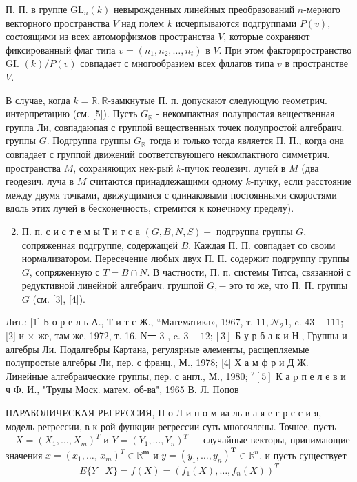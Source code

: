\documentclass[10pt]{article}
\begin{document}
П. П. в группе $\mathrm{GL}_{n}(k)$ невырожденных линейных преобразований $n$-мерного векторного пространства $V$ над полем $k$ исчерпываются подгруппами $P(v)$, состоящими из всех автоморфизмов пространства $V$, которые сохраняют фиксированный флаг типа $v=\left(n_{1}, n_{2}, \ldots, n_{t}\right)$ в $V$. При этом факторпространство GI. $(k) / P(v)$ совпадает с многообразием всех фллагов типа $v$ в пространстве $V$.

В случае, когда $k=\mathbb{R}, \mathbb{R}$-замкнутые П. п. допускают следующую геометрич. интерпретацию (см. [5]). Пусть $G_{\mathbb{R}}$ - некомпактная полупростая вещественная группа Ли, совпадаюпая с группой вещественных точек полупростой алгебраич. группы $G$. Подгруппа группы $G_{\mathbb{R}}$ тогда и только тогда является П. П., когда она совпадает с группой движений соответствующего некомпактного симметрич. пространства $M$, сохраняющих нек-рый $k$-пучок геодезич. лучей в $M$ (два геодезич. луча в $M$ считаются принадлежащими одному $k$-пучку, если расстояние между двумя точками, движущимися с одинаковыми постоянными скоростями вдоль этих лучей в бесконечность, стремится к конечному пределу).

\begin{enumerate}
  \setcounter{enumi}{1}
  \item П. п. с и с т е м ы Т и т с а $(G, B, N, S)-$ подгруппа группы $G$, сопряженная подгруппе, содержащей $B$. Каждая П. П. совпадает со своим нормализатором. Пересечение любых двух П. П. содержит подгруппу группы $G$, сопряженную с $T=B \cap N$. В частности, П. п. системы Титса, связанной с редуктивной линейной алгебраич. грушпой $G,-$ это то же, что П. П. группы $G$ (см. [3], [4]).
\end{enumerate}

Лит.: [1] Б о р е л ь А., Т и т с Ж., “Математика», 1967, т. $11, \mathcal{N}_{2} 1$, c. $43-111$; [2] и $\times$ же, там же, 1972, т. 16, Nㅡ 3 , c. $3-12 ;[3]$ Б у р б а к и Н., Группы и алгебры Ли. Подалгебры Картана, регулярные әлементы, расщепляемые полупростые алгебры Ли, пер. с франц., М., 1978; [4] Х а м ф р и Д Ж. Линейные алгебраические группы, пер. с англ., М., 1980; ${ }^{2}[5]$ К а p п е л е в и ч Ф. И., "Труды Моск. матем. об-ва", 1965
В. Л. Попов

ПАРАБОЛИЧЕСКАЯ РЕГРЕССИЯ, П $о$ Л и н $о$ м иа ль в а я е г р с с и я,- модель регрессии, в к-рой функции регрессии суть многочлены. Точнее, пусть $\quad X=\left(X_{1}, \ldots, X_{m}\right)^{T}$ и $Y=\left(Y_{1}, \ldots, Y_{n}\right)^{T}-$ случайные векторы, принимающие значения $x=\left(x_{1}, \ldots\right.$, $\left.x_{m}\right)^{T} \in \mathbb{R}^{\boldsymbol{m}}$ и $y=\left(y_{1}, \ldots, y_{n}\right)^{\boldsymbol{T}} \in \mathbb{R}^{n}$, и пусть существует\[
E\{Y \mid X\}=f(X)=\left(f_{1}(X), \ldots, f_{n}(X)\right)^{T}
\]
\end{document}
